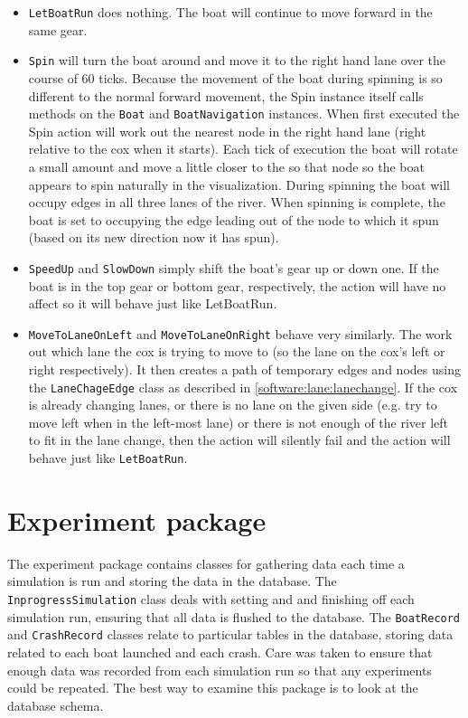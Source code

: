   \begin{itemize}
  
    \item \texttt{LetBoatRun} does nothing. The boat will continue to move forward in the same gear.
  
    \item \texttt{Spin} will turn the boat around and move it to the right hand lane over the course of 60 ticks. Because the movement of the boat during spinning is so different to the normal forward movement, the Spin instance itself calls methods on the \texttt{Boat} and \texttt{BoatNavigation} instances. When first executed the Spin action will work out the nearest node in the right hand lane (right relative to the cox when it starts). Each tick of execution the boat will rotate a small amount and move a little closer to the so that node so the boat appears to spin naturally in the visualization. During spinning the boat will occupy edges in all three lanes of the river. When spinning is complete, the boat is set to occupying the edge leading out of the node to which it spun (based on its new direction now it has spun).
  
    \item \texttt{SpeedUp} and \texttt{SlowDown} simply shift the boat's gear up or down one. If the boat is in the top gear or bottom gear, respectively, the action will have no affect so it will behave just like LetBoatRun.
  
    \item \texttt{MoveToLaneOnLeft} and \texttt{MoveToLaneOnRight} behave very similarly. The work out which lane the cox is trying to move to (so the lane on the cox's left or right respectively). It then creates a path of temporary edges and nodes using the \texttt{LaneChageEdge} class as described in \ref{software:lane:lanechange}. If the cox is already changing lanes, or there is no lane on the given side (e.g. try to move left when in the left-most lane) or there is not enough of the river left to fit in the lane change, then the action will silently fail and the action will behave just like \texttt{LetBoatRun}.
  \end{itemize}
\section{Experiment package}\label{software:experiment}
The experiment package contains classes for gathering data each time a
simulation is run and storing the data in the database. The
\texttt{InprogressSimulation} class deals with setting and and finishing off
each simulation run, ensuring that all data is flushed to the
database. The \texttt{BoatRecord} and \texttt{CrashRecord} classes relate to particular
tables in the database, storing data related to each boat launched and
each crash. Care was taken to ensure that enough data was recorded
from each simulation run so that any experiments could be repeated.
The best way to examine this package is to look at the database schema.

